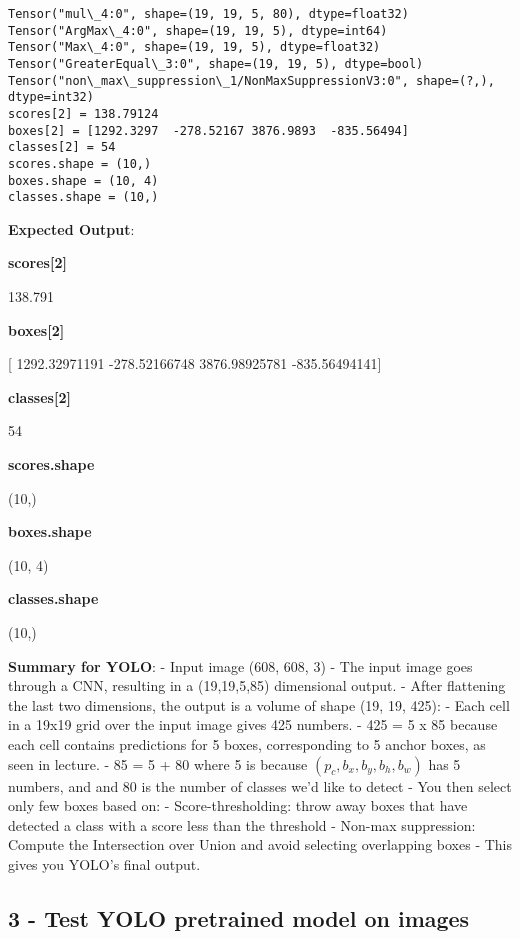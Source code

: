\documentclass[11pt]{article}
\begin{document}
    \begin{Verbatim}[commandchars=\\\{\}]
Tensor("mul\_4:0", shape=(19, 19, 5, 80), dtype=float32)
Tensor("ArgMax\_4:0", shape=(19, 19, 5), dtype=int64) Tensor("Max\_4:0", shape=(19, 19, 5), dtype=float32)
Tensor("GreaterEqual\_3:0", shape=(19, 19, 5), dtype=bool)
Tensor("non\_max\_suppression\_1/NonMaxSuppressionV3:0", shape=(?,), dtype=int32)
scores[2] = 138.79124
boxes[2] = [1292.3297  -278.52167 3876.9893  -835.56494]
classes[2] = 54
scores.shape = (10,)
boxes.shape = (10, 4)
classes.shape = (10,)

    \end{Verbatim}

    \textbf{Expected Output}:

\textbf{scores{[}2{]}}

138.791

\textbf{boxes{[}2{]}}

{[} 1292.32971191 -278.52166748 3876.98925781 -835.56494141{]}

\textbf{classes{[}2{]}}

54

\textbf{scores.shape}

(10,)

\textbf{boxes.shape}

(10, 4)

\textbf{classes.shape}

(10,)

     \textbf{Summary for YOLO}: - Input image (608, 608, 3) - The input
image goes through a CNN, resulting in a (19,19,5,85) dimensional
output. - After flattening the last two dimensions, the output is a
volume of shape (19, 19, 425): - Each cell in a 19x19 grid over the
input image gives 425 numbers. - 425 = 5 x 85 because each cell contains
predictions for 5 boxes, corresponding to 5 anchor boxes, as seen in
lecture. - 85 = 5 + 80 where 5 is because \((p_c, b_x, b_y, b_h, b_w)\)
has 5 numbers, and and 80 is the number of classes we'd like to detect -
You then select only few boxes based on: - Score-thresholding: throw
away boxes that have detected a class with a score less than the
threshold - Non-max suppression: Compute the Intersection over Union and
avoid selecting overlapping boxes - This gives you YOLO's final output.

    \hypertarget{test-yolo-pretrained-model-on-images}{%
\subsection{3 - Test YOLO pretrained model on
images}\label{test-yolo-pretrained-model-on-images}}
\end{document}
